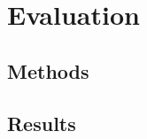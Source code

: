 \chapter{Evaluation}
\vspace{-1.6em}
%

\minitoc%
\thispagestyle{empty}
\newpage

\section{Methods}

\section{Results}

